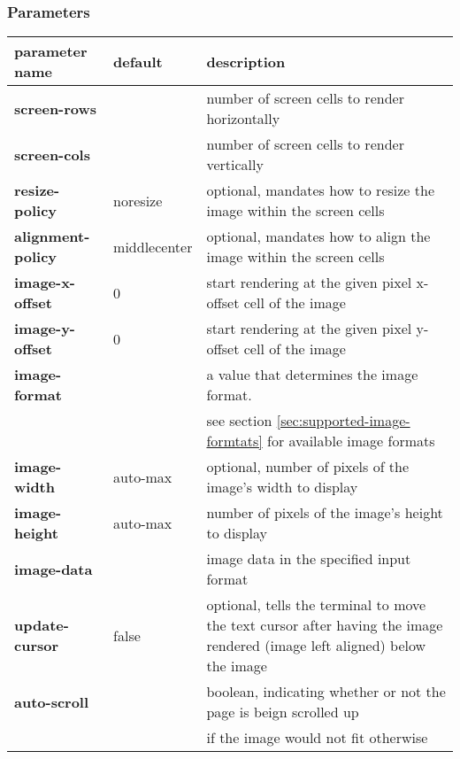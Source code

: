 \documentclass[a4paper]{article}
\begin{document}
\subsubsection*{Parameters}

\begin{tabular}{|m{3cm}|m{2cm}|m{11cm}|}
    \hline
    \textbf{parameter name} & \textbf{default} & \textbf{description} \\
    \hline
    \textbf{screen-rows}      &                  & number of screen cells to render horizontally \\
    \textbf{screen-cols}      &                  & number of screen cells to render vertically \\
    \textbf{resize-policy}    & noresize         & optional, mandates how to resize the image within the screen cells \\
    \textbf{alignment-policy} & middlecenter     & optional, mandates how to align the image within the screen cells \\
    \textbf{image-x-offset}   & 0                & start rendering at the given pixel x-offset cell of the image \\
    \textbf{image-y-offset}   & 0                & start rendering at the given pixel y-offset cell of the image \\
    \textbf{image-format}     &                  & a value that determines the image format. \\
                              &                  & see section \ref{sec:supported-image-formtats} for available image formats \\
    \textbf{image-width}      & auto-max         & optional, number of pixels of the image's width to display \\
    \textbf{image-height}     & auto-max         & number of pixels of the image's height to display \\
    \textbf{image-data}       &                  & image data in the specified input format \\
    \textbf{update-cursor}    & false            & optional, tells the terminal to move the text cursor after having the image rendered (image left aligned) below the image \\
    \textbf{auto-scroll}      &                  & boolean, indicating whether or not the page is beign scrolled up \\
                              &                  & if the image would not fit otherwise \\
    \hline
\end{tabular}
\end{document}
